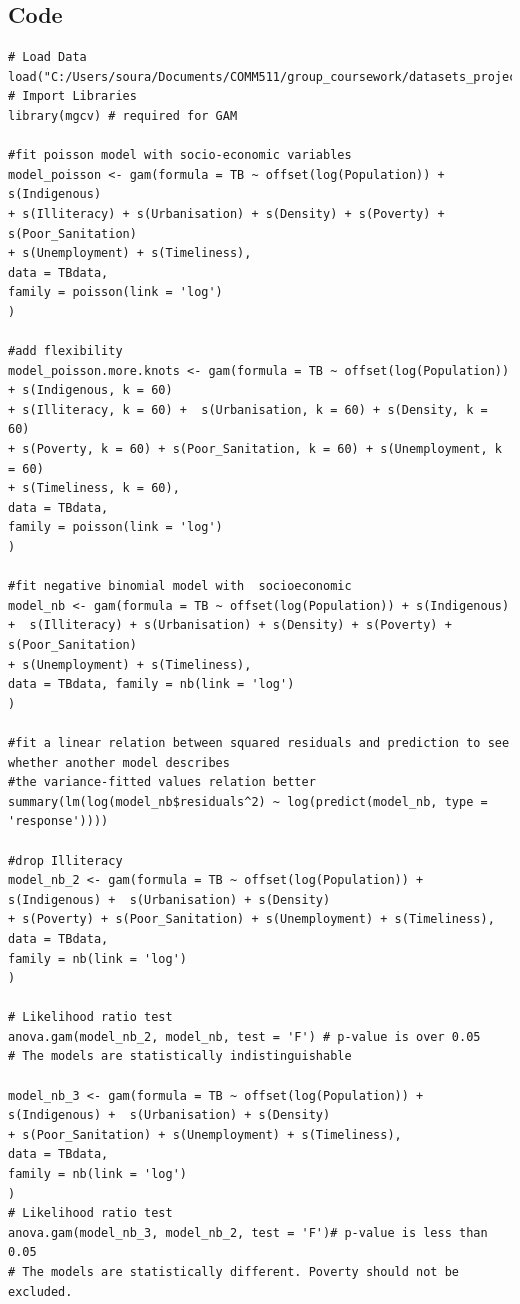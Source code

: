 \subsection{Code}
\begin{verbatim}
# Load Data
load("C:/Users/soura/Documents/COMM511/group_coursework/datasets_project.RData")
# Import Libraries
library(mgcv) # required for GAM 

#fit poisson model with socio-economic variables
model_poisson <- gam(formula = TB ~ offset(log(Population)) + s(Indigenous)
+ s(Illiteracy) + s(Urbanisation) + s(Density) + s(Poverty) + s(Poor_Sanitation)
+ s(Unemployment) + s(Timeliness), 
data = TBdata, 
family = poisson(link = 'log')
)

#add flexibility
model_poisson.more.knots <- gam(formula = TB ~ offset(log(Population)) + s(Indigenous, k = 60) 
+ s(Illiteracy, k = 60) +  s(Urbanisation, k = 60) + s(Density, k = 60) 
+ s(Poverty, k = 60) + s(Poor_Sanitation, k = 60) + s(Unemployment, k = 60) 
+ s(Timeliness, k = 60), 
data = TBdata, 
family = poisson(link = 'log')
)

#fit negative binomial model with  socioeconomic
model_nb <- gam(formula = TB ~ offset(log(Population)) + s(Indigenous) 
+  s(Illiteracy) + s(Urbanisation) + s(Density) + s(Poverty) + s(Poor_Sanitation)
+ s(Unemployment) + s(Timeliness), 
data = TBdata, family = nb(link = 'log')
)

#fit a linear relation between squared residuals and prediction to see whether another model describes
#the variance-fitted values relation better
summary(lm(log(model_nb$residuals^2) ~ log(predict(model_nb, type = 'response'))))

#drop Illiteracy
model_nb_2 <- gam(formula = TB ~ offset(log(Population)) + s(Indigenous) +  s(Urbanisation) + s(Density) 
+ s(Poverty) + s(Poor_Sanitation) + s(Unemployment) + s(Timeliness),
data = TBdata,
family = nb(link = 'log')
)

# Likelihood ratio test
anova.gam(model_nb_2, model_nb, test = 'F') # p-value is over 0.05
# The models are statistically indistinguishable

model_nb_3 <- gam(formula = TB ~ offset(log(Population)) + s(Indigenous) +  s(Urbanisation) + s(Density) 
+ s(Poor_Sanitation) + s(Unemployment) + s(Timeliness), 
data = TBdata, 
family = nb(link = 'log')
)
# Likelihood ratio test
anova.gam(model_nb_3, model_nb_2, test = 'F')# p-value is less than 0.05
# The models are statistically different. Poverty should not be excluded.


\end{verbatim}
